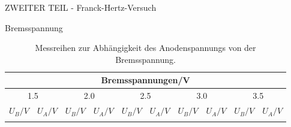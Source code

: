 \begin{appendix}
\begin{chapter}{ZWEITER TEIL - Franck-Hertz-Versuch}
\begin{section}{Bremsspannung}
      \begin{scriptsize}
        \begin{longtable}[htbp]{|c|c|c|c|c|c|c|c|c|c|}
          \hline
          \multicolumn{10}{|c|}{Bremsspannungen/V} \\ \hline 
          \multicolumn{2}{|c|}{1.5} & \multicolumn{2}{|c|}{2.0} &
          \multicolumn{2}{|c|}{2.5} & \multicolumn{2}{|c|}{3.0} & 
          \multicolumn{2}{|c|}{3.5} \\ \hline
          $U_{B}/V$ & $U_{A}/V$ & $U_{B}/V$ & $U_{A}/V$ &
          $U_{B}/V$ & $U_{A}/V$ & $U_{B}/V$ & $U_{A}/V$ &
          $U_{B}/V$ & $U_{A}/V$ \\ \hline\hline \endhead
          
          \caption{Messreihen zur Abhängigkeit des Anodenspannungs von der
              Bremsspannung.}
          \label{tab:FHbremsspannung}
        \end{longtable}
      \end{scriptsize}
    \end{section}
    
    
    

\end{chapter}
\end{appendix}
